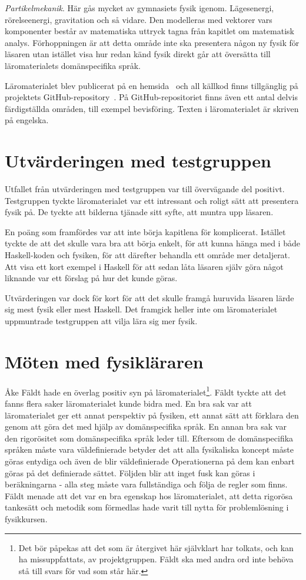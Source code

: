 \textit{Partikelmekanik}. Här gås mycket av gymnasiets fysik igenom.
Lägesenergi, rörelseenergi, gravitation och så vidare. Den modelleras med vektorer vars
komponenter består av matematiska uttryck tagna från kapitlet om matematisk
analys. Förhoppningen är att detta område inte ska presentera någon ny fysik för
läsaren utan istället visa hur redan känd fysik direkt går att översätta till läromaterialets domänspecifika språk.

Läromaterialet blev publicerat på en hemsida~\cite{LYAP} och all källkod finns
tillgänglig på projektets GitHub-repository~\cite{LYAP_repo}. På GitHub-repositoriet finns även ett antal delvis färdigställda områden, till exempel bevisföring. Texten i läromaterialet är skriven
på engelska.

\section{Utvärderingen med testgruppen}\label{sec:res_test}

Utfallet från utvärderingen med testgruppen var till övervägande del positivt.
Testgruppen tyckte läromaterialet var ett intressant och roligt sätt att
presentera fysik på. De tyckte att bilderna tjänade sitt syfte, att muntra upp
läsaren. 

En poäng som framfördes var att inte börja kapitlena för komplicerat. Istället
tyckte de att det skulle vara bra att börja enkelt, för att kunna hänga med i
både Haskell-koden och fysiken, för att därefter behandla ett område mer
detaljerat. Att visa ett kort exempel i Haskell för att sedan låta läsaren själv
göra något liknande var ett förslag på hur det kunde göras.

Utvärderingen var dock för kort för att det skulle framgå huruvida läsaren lärde
sig mest fysik eller mest Haskell. Det framgick heller inte om läromaterialet
uppmuntrade testgruppen att vilja lära sig mer fysik.

\section{Möten med fysikläraren}\label{sec:res_ake}

Åke Fäldt hade en överlag positiv syn på läromaterialet\footnote{Det bör
påpekas att det som är återgivet här självklart har tolkats, och kan ha
missuppfattats, av projektgruppen. Fäldt ska med andra ord inte behöva stå till
svars för vad som står här.}. Fäldt tyckte att det fanns flera saker
läromaterialet kunde bidra med. En bra sak var att läromaterialet ger ett annat
perspektiv på fysiken, ett annat sätt att förklara den genom att göra det med
hjälp av domänspecifika språk. En annan bra sak var den rigorösitet som
domänspecifika språk leder till. Eftersom de domänspecifika språken måste vara
väldefinierade betyder det att alla fysikaliska koncept måste göras entydiga och
även de blir väldefinierade Operationerna på dem kan enbart göras på det
definierade sättet. Följden blir att inget fusk kan göras i beräkningarna - alla
steg måste vara fullständiga och följa de regler som finns. Fäldt menade att det
var en bra egenskap hos läromaterialet, att detta rigorösa tankesätt och metodik
som förmedlas hade varit till nytta för problemlösning i fysikkursen.


